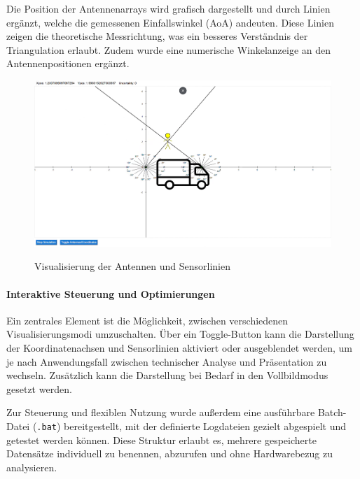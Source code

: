 \documentclass[a4paper, 12pt]{article} %
\begin{document}
Die Position der Antennenarrays wird grafisch dargestellt und durch Linien ergänzt, welche die gemessenen Einfallswinkel (\ac{AoA}) andeuten. Diese Linien 
zeigen die theoretische Messrichtung, was ein besseres Verständnis der Triangulation erlaubt. Zudem wurde eine numerische Winkelanzeige an den 
Antennenpositionen ergänzt.

\begin{figure}[H]
    \includegraphics[width=1\linewidth]{images/Visualisierung Antennen.png}\\[1ex]
    \centering
    \caption{Visualisierung der Antennen und Sensorlinien}
    \label{ABBILDUNG}
\end{figure}


\paragraph{Interaktive Steuerung und Optimierungen}

Ein zentrales Element ist die Möglichkeit, zwischen verschiedenen Visualisierungsmodi umzuschalten. Über ein Toggle-Button kann die Darstellung der 
Koordinatenachsen und Sensorlinien aktiviert oder ausgeblendet werden, um je nach Anwendungsfall zwischen technischer Analyse und Präsentation zu 
wechseln. Zusätzlich kann die Darstellung bei Bedarf in den Vollbildmodus gesetzt werden.

Zur Steuerung und flexiblen Nutzung wurde außerdem eine ausführbare Batch-Datei (\texttt{.bat}) bereitgestellt, mit der definierte Logdateien gezielt 
abgespielt und getestet werden können. Diese Struktur erlaubt es, mehrere gespeicherte Datensätze individuell zu benennen, abzurufen und ohne 
Hardwarebezug zu analysieren.
\end{document}
